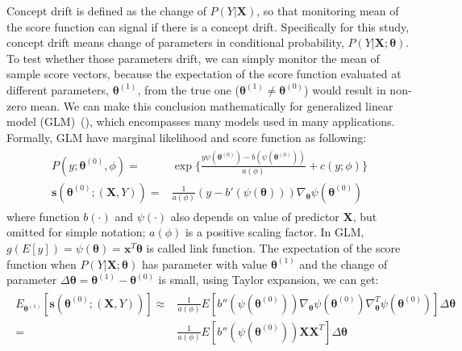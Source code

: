 \documentclass[twoside,11pt]{article}
\begin{document}
Concept drift is defined as the change of $ P (Y|\bm {X})$, so that monitoring mean of the score function can signal if there is a concept drift. Specifically for this study, concept drift means change of parameters in conditional probability, $P(Y|\bm {X}; \bm { \theta})$. To test whether those parameters drift, we can simply monitor the mean of sample score vectors, because the expectation of the score function evaluated at different parameters, $\bm { \theta} ^{ (1)}$, from the true one ($\bm { \theta} ^{ (1)} \neq \bm { \theta} ^{ (0)}$) would result in non-zero mean. We can make this conclusion mathematically for generalized linear model (GLM)~(\cite{nelder1972generalized}), which encompasses many models used in many applications. Formally, GLM have marginal likelihood and score function as following:
\begin{align}
\begin{aligned}
P(y;\bm { \theta} ^{(0)}, \phi) =& \exp\{\frac{y \psi(\bm { \theta} ^{(0)})-b( \psi(\bm { \theta} ^{(0)}))}{ a ( \phi)} + c(y; \phi)\} \\
\bm {s}(\bm { \theta} ^{(0)};(\bm {X}, Y)) =& \frac{1}{a( \phi)}(y - b'( \psi (\bm { \theta})))\nabla _{ \bm { \theta}} \psi(\bm { \theta} ^{(0)})
\end{aligned}
\label{eqn:score_glm}
\end{align}
where function $b(\cdot)$ and $ \psi(\cdot)$ also depends on value of predictor $\bm { X}$, but omitted for simple notation; $ a ( \phi)$ is a positive scaling factor. In GLM, $ g(E[y]) = \psi ( \bm { \theta})=\bm {x}^T\bm { \theta}$ is called link function. The expectation of the score function when $P(Y|\bm {X};\bm{\theta})$ has parameter with value $\bm { \theta} ^{(1)}$ and the change of parameter $ \Delta \bm { \theta}= \bm { \theta}^{(1)}-\bm { \theta}^{(0)}$ is small, using Taylor expansion, we can get:
\begin{align}
\begin{aligned}
E _{\bm { \theta} ^{(1)}}[\bm {s}(\bm { \theta} ^{(0)};(\bm {X}, Y))] \approx& \frac{1}{a ( \phi)}E[b''( \psi( \bm { \theta} ^{(0)}))\nabla _{ \bm { \theta}} \psi ( \bm { \theta} ^{ (0)}) \nabla _{ \bm { \theta}}^T \psi ( \bm { \theta} ^{ (0)})] \Delta \bm { \theta} \\
=& \frac{1}{a ( \phi)}E[b''( \psi( \bm { \theta} ^{(0)}))\bm {X}\bm {X}^T] \Delta \bm { \theta}
\end{aligned}
\label{eqn:exp_score_glm}
\end{align}
\end{document}
